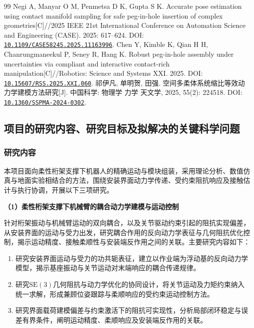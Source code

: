 \documentclass[UTF8,a4paper,zihao=-4,fontset=fandol]{ctexart}
\newcommand{\topic}[1]{\par\Needspace{4\baselineskip}\addvspace{0.5em}\noindent\textbf{#1}\par\nobreak}
\newcommand{\rev}[1]{{\color{red}#1}}
\newcommand{\doi}[1]{\href{https://doi.org/#1}{\nolinkurl{#1}}}
\newcommand{\SE}{\mathrm{SE}(3)}
\begin{document}
\begin{thebibliography}{99}
 Negi A, Manyar O M, Penmetsa D K, Gupta S K. Accurate pose estimation using contact manifold sampling for safe peg-in-hole insertion of complex geometries[C]//2025 IEEE 21st International Conference on Automation Science and Engineering (CASE). 2025: 617--624. DOI: \doi{10.1109/CASE58245.2025.11163996}.
 Chen Y, Kimble K, Qian H H, Chanrungmaneekul P, Seney R, Hang K. Robust peg-in-hole assembly under uncertainties via compliant and interactive contact-rich manipulation[C]//Robotics: Science and Systems XXI. 2025. DOI: \doi{10.15607/RSS.2025.XXI.060}.
 祁伊凡, 单明贺, 田强. 空间多柔体系统缩比等效动力学建模方法研究[J]. 中国科学: 物理学 力学 天文学, 2025, 55(2): 224518. DOI: \doi{10.1360/SSPMA-2024-0302}.
\end{thebibliography}
\endgroup

\subsection{项目的研究内容、研究目标及拟解决的关键科学问题}

\subsubsection{研究内容}

本项目面向柔性\rev{桁架}支撑下机器人的精确运动与模块组装，采用理论分析、数值仿真与地面\rev{实验}相结合的方法，\rev{围绕安装界面动力学传递、受约束阻抗响应及接触估计与执行协调，开展以下三项}研究。

\topic{（1）柔性桁架支撑下机械臂的耦合动力学建模与运动控制}

\rev{针对}桁架\rev{振动与}机械臂运动的双向耦合\rev{，以及关节驱动约束引起}的\rev{阻抗实现偏差}，从安装界面的运动与受力出发，\rev{研究耦合作用}的\rev{反向}动力学\rev{表征与}几何阻抗\rev{优化控制，揭示运动精度、接触柔顺性}与\rev{安装端反作用之间}的\rev{关联}。主要研究内容如下：
\begin{enumerate}[label=\arabic*)]
 \item 研究安装\rev{界面}运动与受力\rev{的功共轭}表征，建立以作业端为浮动基的\rev{反向}动力学模型，\rev{揭示}基座振动\rev{与关节}运动对末端响应的\rev{耦合传递}规律。
 \item 研究\rev{$\SE$}几何阻抗与动力学优化\rev{的协同设计，将关节运动及力矩约束纳入统一求解，形成兼顾位姿跟踪与柔顺响应的受约束运动}控制方法。
 \item 研究\rev{界面载荷}建模偏差\rev{与}约束\rev{激活下的}阻抗\rev{可实现性}，\rev{分析局部闭环稳定与误差有界条件，阐明}运动精度、柔顺\rev{响应及}安装端反作用的关联。
\end{enumerate}
\end{document}
